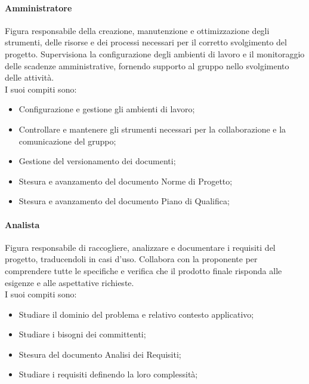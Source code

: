 \documentclass[10pt]{article}
\begin{document}
\begin{justify}
        \paragraph{Amministratore}
        Figura responsabile della creazione, manutenzione e ottimizzazione degli strumenti, delle risorse e dei processi necessari per il corretto svolgimento del progetto. Supervisiona la configurazione degli ambienti di lavoro e il monitoraggio delle scadenze amministrative, fornendo supporto al gruppo nello svolgimento delle attività.\\
        I suoi compiti sono:
        \begin{itemize}
            \item Configurazione e gestione gli ambienti di lavoro;
            \item Controllare e mantenere gli strumenti necessari per la collaborazione e la comunicazione del gruppo;
            \item Gestione del versionamento dei documenti;
            \item Stesura e avanzamento del documento Norme di Progetto;
            \item Stesura e avanzamento del documento Piano di Qualifica;
        \end{itemize}

        \paragraph{Analista}
        Figura responsabile di raccogliere, analizzare e documentare i requisiti del progetto, traducendoli in casi d'uso. Collabora con la proponente per comprendere tutte le specifiche e verifica che il prodotto finale risponda alle esigenze e alle aspettative richieste.\\
        I suoi compiti sono:
        \begin{itemize}
            \item Studiare il dominio del problema e relativo contesto applicativo;
            \item Studiare i bisogni dei committenti;
            \item Stesura del documento Analisi dei Requisiti;
            \item Studiare i requisiti definendo la loro complessità;
        \end{itemize}


\end{justify}
\end{document}
